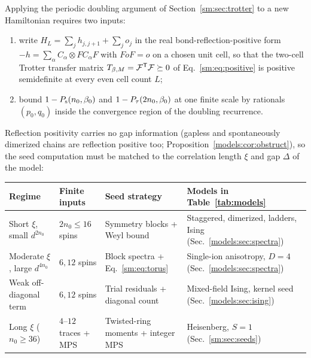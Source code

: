 Applying the periodic doubling argument of Section~\ref{sm:sec:trotter} to a
new Hamiltonian requires two inputs:
\begin{enumerate}
    \item write $H_L=\sum_j h_{j,j+1}+\sum_j o_j$ in the real
          bond-reflection-positive form $-h=\sum_\alpha C_\alpha\otimes FC_\alpha F$
          with $FoF=o$ on a chosen unit cell, so that the two-cell Trotter
          transfer matrix $T_{\beta,M}=\mathcal F^{\mathsf T}\mathcal F\succeq0$ of
          Eq.~\eqref{sm:eq:positive} is positive semidefinite at every even cell
          count $L$;
    \item bound $1-P_{\mathrm s}(n_0,\beta_0)$ and $1-P_{\tau}(2n_0,\beta_0)$ at one
          finite scale by rationals $(p_0,q_0)$ inside the convergence region of
          the doubling recurrence.
\end{enumerate}

Reflection positivity carries no gap information (gapless and
spontaneously dimerized chains are reflection positive too;
Proposition~\ref{models:cor:obstruct}), so the seed computation must be
matched to the correlation length $\xi$ and gap $\Delta$ of the model:
\begin{center}
    \renewcommand{\arraystretch}{1.3}
    \setlength{\tabcolsep}{4pt}
    \begin{tabular}{@{}llp{4.1cm}p{5.3cm}@{}}
        \toprule
        Regime                           & Finite inputs          & Seed strategy                           & Models in Table~\ref{tab:models}                                     \\
        \midrule
        Short $\xi$, small $d^{2n_0}$    & $2n_0\le16$ spins      & Symmetry blocks + Weyl bound            & Staggered, dimerized, ladders, Ising (Sec.~\ref{models:sec:spectra}) \\
        Moderate $\xi$, large $d^{4n_0}$ & $6,12$ spins           & Block spectra + Eq.~\eqref{sm:eq:torus} & Single-ion anisotropy, $D=4$ (Sec.~\ref{models:sec:spectra})         \\
        Weak off-diagonal term           & $6,12$ spins           & Trial residuals + diagonal count        & Mixed-field Ising, kernel seed (Sec.~\ref{models:sec:ising})         \\
        Long $\xi$ ($n_0\ge36$)          & $4$--$12$ traces + MPS & Twisted-ring moments + integer MPS      & Heisenberg, $S=1$ (Sec.~\ref{sm:sec:seeds})                          \\
        \bottomrule
    \end{tabular}
\end{center}

